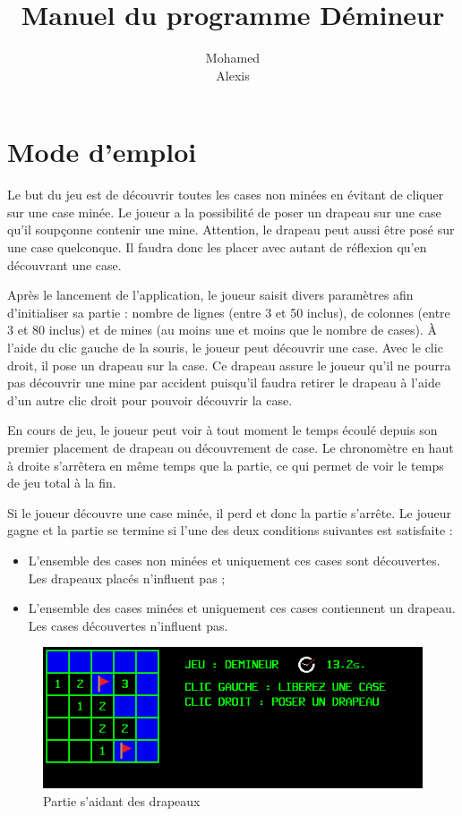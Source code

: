 \documentclass[a4paper, 12pt, oneside]{article}
\title{Manuel du programme Démineur}
\author{Mohamed \bsc{Lakhal}\\Alexis \bsc{Cabodi}}
\date{}
\begin{document}
\maketitle
\newpage
\tableofcontents
\newpage

\section{Mode d'emploi}
Le but du jeu est de découvrir toutes les cases non minées en évitant de cliquer sur une case minée. Le joueur a la possibilité de poser un drapeau sur une case qu'il soupçonne contenir une mine. Attention, le drapeau peut aussi être posé sur une case quelconque. Il faudra donc les placer avec autant de réflexion qu'en découvrant une case.
\bigskip

Après le lancement de l'application, le joueur saisit divers paramètres afin d'initialiser sa partie : nombre de lignes (entre 3 et 50 inclus), de colonnes (entre 3 et 80 inclus) et de mines (au moins une et moins que le nombre de cases).
À l'aide du clic gauche de la souris, le joueur peut découvrir une case. Avec le clic droit, il pose un drapeau sur la case. Ce drapeau assure le joueur qu'il ne pourra pas découvrir une mine par accident puisqu'il faudra retirer le drapeau à l'aide d'un autre clic droit pour pouvoir découvrir la case.
\bigskip

En cours de jeu, le joueur peut voir à tout moment le temps écoulé depuis son premier placement de drapeau ou découvrement de case. Le chronomètre en haut à droite s'arrêtera en même temps que la partie, ce qui permet de voir le temps de jeu total à la fin.
\bigskip

Si le joueur découvre une case minée, il perd et donc la partie s'arrête.
Le joueur gagne et la partie se termine si l'une des deux conditions suivantes est satisfaite :
\begin{itemize}
	\item L'ensemble des cases non minées et uniquement ces cases sont découvertes. Les drapeaux placés n'influent pas ;
	\item L'ensemble des cases minées et uniquement ces cases contiennent un drapeau. Les cases découvertes n'influent pas.
\end{itemize}
\smallskip

\begin{figure}[htp]
\includegraphics[width=\columnwidth]{Exemple.png}
\caption{Partie s'aidant des drapeaux}
\label{fig:picApercu}
\end{figure}
\end{document}
